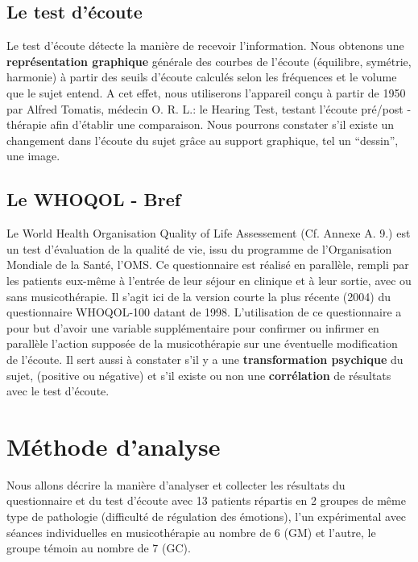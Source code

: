 \subsection *{Le test d'écoute}
Le test d'écoute détecte la manière de recevoir
l'information.
Nous obtenons une
\textbf{représentation graphique} générale des courbes de l'écoute
(équilibre, symétrie, harmonie) à partir des seuils d'écoute
calculés selon les fréquences et le volume que le sujet entend.
A cet effet, nous utiliserons l'appareil conçu à partir de 1950 par Alfred Tomatis, médecin
O. R. L.: le Hearing Test, testant
l'écoute pré/post - thérapie
afin d'établir une comparaison.
Nous pourrons constater
s'il existe un changement dans l'écoute du sujet grâce au support graphique, tel un ``dessin'',
une image. %

\subsection* {Le WHOQOL  - Bref}  
Le World Health 	Organisation Quality of Life Assessement  (Cf. Annexe A. 9.) 
est un test d'évaluation de la qualité de vie, issu du
programme de l'Organisation Mondiale de la Santé, l'OMS.
Ce questionnaire est réalisé en parallèle, rempli par
les patients eux-même à l'entrée de leur séjour en clinique et
à leur sortie, avec ou sans musicothérapie.
Il s'agit ici de la version courte  la plus récente (2004) du questionnaire
WHOQOL-100 datant de 1998.
L'utilisation de ce questionnaire a pour but d'avoir
une variable supplémentaire pour confirmer ou infirmer en
parallèle l'action supposée  de la musicothérapie sur une éventuelle
modification de l'écoute.
Il sert aussi à constater s'il y a une\textbf{ transformation psychique }du sujet,
(positive ou négative) et s'il existe ou non une \textbf{corrélation }de
résultats avec le test d'écoute.

\section{Méthode d'analyse}
Nous allons décrire la manière d'analyser et collecter les résultats du questionnaire et du test d'écoute 
avec 13 patients répartis en 2 groupes de même type de pathologie (difficulté de régulation des 
émotions), l'un expérimental avec séances individuelles en musicothérapie au nombre de 6 (GM) et 
l'autre, le groupe témoin au 
nombre 
de 7 (GC).
